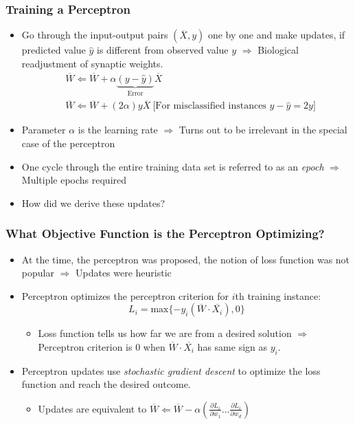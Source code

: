 \documentclass[aspectratio=169,mathserif]{beamer}
\begin{document}
\begin{frame}
\frametitle{Training a Perceptron}
\begin{itemize}
\item Go through the input-output pairs $(\overline{X}, y)$ one by one and make
updates, if predicted value $\hat{y}$ is different from observed
value $y$ $\Rightarrow$ Biological readjustment of synaptic weights.
\begin{eqnarray*}
& \overline{W}  \Leftarrow  \overline{W} +
\alpha \underbrace{(y - \hat{y})}_{\mbox{Error}} \overline{X}\\
& \overline{W}  \Leftarrow  \overline{W} + (2 \alpha)  y
\overline{X} \ \mbox{[For misclassified instances $y -\hat{y}= 2y$]}
\end{eqnarray*}
\item Parameter $\alpha$ is the learning rate $\Rightarrow$ Turns
out to be irrelevant in the special case of the perceptron
\item One cycle through the entire training data set is referred to
as an {\em epoch} $\Rightarrow$ Multiple epochs required
\item How did we derive these updates?
\end{itemize}
\end{frame}




\begin{frame}
\frametitle{What Objective Function is the Perceptron Optimizing?}
\begin{itemize}
\item At the time, the perceptron was proposed, the notion of loss
function was not popular $\Rightarrow$ Updates were heuristic

\item  Perceptron optimizes the perceptron criterion for $i$th training instance:
\begin{equation*}
 L_i= \mbox{max} \{ -y_i (\overline{W}\cdot \overline{X_i}), 0 \}
\end{equation*}
\begin{itemize}
\item Loss function tells us how far we are from a desired solution
$\Rightarrow$ Perceptron criterion is  0 when $\overline{W} \cdot
\overline{X_i}$ has same sign as $y_i$.
\end{itemize}
\item  Perceptron updates use  {\em stochastic gradient descent} to optimize the loss function and reach
the desired outcome.
\begin{itemize}
\item Updates are equivalent to $\overline{W} \Leftarrow  \overline{W}
- \alpha \left( \frac{\partial L_i}{\partial w_1} \ldots
\frac{\partial L_i}{\partial w_d} \right)$ \end{itemize}
\end{itemize}
\end{frame}
\end{document}
